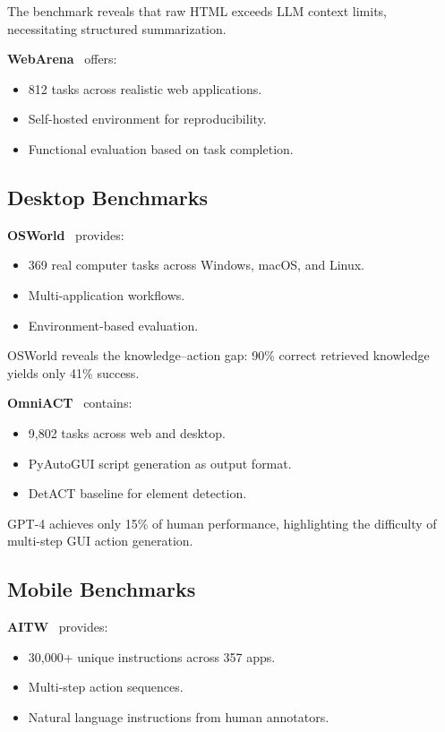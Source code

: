 \documentclass[11pt]{article}
\begin{document}
The benchmark reveals that raw HTML exceeds LLM context limits, necessitating structured summarization.

\textbf{WebArena}~\cite{webarena2024} offers:

\begin{itemize}
    \item 812 tasks across realistic web applications.
    \item Self-hosted environment for reproducibility.
    \item Functional evaluation based on task completion.
\end{itemize}

\subsection{Desktop Benchmarks}

\textbf{OSWorld}~\cite{osworld2024} provides:

\begin{itemize}
    \item 369 real computer tasks across Windows, macOS, and Linux.
    \item Multi-application workflows.
    \item Environment-based evaluation.
\end{itemize}

OSWorld reveals the knowledge--action gap: 90\% correct retrieved knowledge yields only 41\% success.

\textbf{OmniACT}~\cite{omniact2024} contains:

\begin{itemize}
    \item 9,802 tasks across web and desktop.
    \item PyAutoGUI script generation as output format.
    \item DetACT baseline for element detection.
\end{itemize}

GPT-4 achieves only 15\% of human performance, highlighting the difficulty of multi-step GUI action generation.

\subsection{Mobile Benchmarks}

\textbf{AITW}~\cite{aitw2023} provides:

\begin{itemize}
    \item 30,000+ unique instructions across 357 apps.
    \item Multi-step action sequences.
    \item Natural language instructions from human annotators.
\end{itemize}
\end{document}
